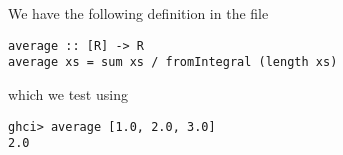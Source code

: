 
We have the following definition in the file 
\scriptsize\begin{verbatim}
average :: [R] -> R
average xs = sum xs / fromIntegral (length xs)
\end{verbatim}\normalsize
which we test using
\scriptsize\begin{verbatim}
ghci> average [1.0, 2.0, 3.0]
2.0
\end{verbatim}\normalsize
